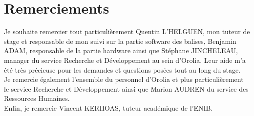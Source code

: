 \chapter{Remerciements}



Je souhaite remercier tout particulièrement Quentin L'HELGUEN, mon tuteur de stage et responsable de mon suivi sur la partie software des balises, Benjamin ADAM, responsable de la partie hardware ainsi que Stéphane JINCHELEAU, manager du service Recherche et Développement au sein d'Orolia. Leur aide m'a été très précieuse pour les demandes et questions posées tout au long du stage.\\

Je remercie également l'ensemble du personnel d'Orolia et plus particulièrement le service Recherche et Développement ainsi que Marion AUDREN du service des Ressources Humaines.\\

Enfin, je remercie Vincent KERHOAS, tuteur académique de l'ENIB.
